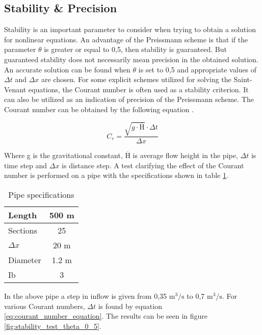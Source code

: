 \subsection{Stability \& Precision} \label{subse:stability_and_precision}

Stability is an important parameter to consider when trying to obtain a solution for nonlinear equations. 
An advantage of the Preissmann scheme is that if the parameter $\theta$ is greater or equal to 0,5, then stability is guaranteed. But guaranteed stability does not necessarily mean precision in the obtained solution. An accurate solution can be found when $\theta$ is set to 0,5 and appropriate values of $\Delta t$ and $\Delta x$ are chosen. For some explicit schemes utilized for solving the Saint-Venant equations, the Courant number is often used as a stability criterion. It can also be utilized as an indication of precision of the Preissmann scheme. The Courant number can be obtained by the following equation \cite{cunge1980practical,szymkiewicz2010numerical}.

\begin{equation} \label{eq:courant_number_equation}
	C_r =  \frac{\sqrt{g \cdot \overline{\text{H}}} \cdot \Delta t}{\Delta x}
\end{equation}

Where g is the gravitational constant, $\overline{\text{H}}$ is average flow height in the pipe, $\Delta t$ is time step and $\Delta x$ is distance step. A test clarifying the effect of the Courant number is performed on a pipe with the specifications shown in table \ref{tab:pipe_stability_test}.

\begin{table}[H]
\centering
\begin{tabular}{|l|c|}  \hline
Length  	& 500 m \\ \hline
Sections 	& 25  	\\ \hline
$\Delta x$	& 20 m  \\ \hline
Diameter	& 1.2 m \\ \hline
Ib			& 3 \textperthousand \\ \hline
\end{tabular}
\caption{Pipe specifications}
\label{tab:pipe_stability_test}
\end{table}

In the above pipe a step in inflow is given from 0,35 $\text{m}^\text{3}/ \text{s}$ to 0,7 $\text{m}^\text{3}/ \text{s}$. For various Courant numbers, $\Delta t$ is found by equation \ref{eq:courant_number_equation}. The results can be seen in figure \ref{fig:stability_test_theta_0_5}. 

